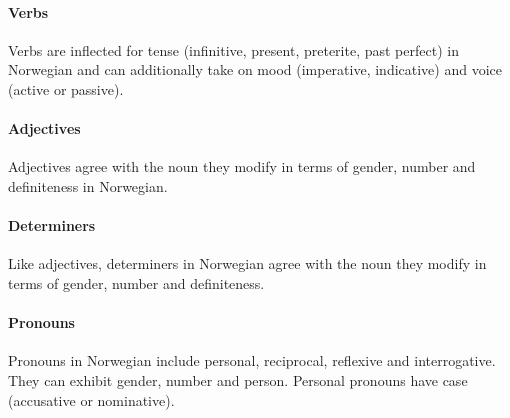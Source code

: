 \documentclass[11pt,a4paper]{article}
\begin{document}
\paragraph{Verbs}
Verbs are inflected for tense (infinitive, present, preterite, past perfect)
in Norwegian and can additionally take on mood (imperative, indicative) and
voice (active or passive).

\paragraph{Adjectives}
Adjectives agree with the noun they modify in terms of gender, number and
definiteness in Norwegian.

\paragraph{Determiners}
Like adjectives, determiners in Norwegian agree with the noun they modify in
terms of gender, number and definiteness.

\paragraph{Pronouns}
Pronouns in Norwegian include personal, reciprocal, reflexive and
interrogative. They can exhibit gender, number and person. Personal pronouns
have case (accusative or nominative).

\end{document}
